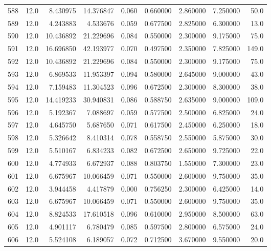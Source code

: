 \begin{tabular}{lrrrrrrrr}
588  &   12.0 &   8.430975 &  14.376847 &  0.060 &  0.660000 &  2.860000 &   7.250000 &   50.0 \\
589  &   12.0 &   4.243883 &   4.533676 &  0.059 &  0.677500 &  2.825000 &   6.300000 &   13.0 \\
590  &   12.0 &  10.436892 &  21.229696 &  0.084 &  0.550000 &  2.300000 &   9.175000 &   75.0 \\
591  &   12.0 &  16.696850 &  42.193977 &  0.070 &  0.497500 &  2.350000 &   7.825000 &  149.0 \\
592  &   12.0 &  10.436892 &  21.229696 &  0.084 &  0.550000 &  2.300000 &   9.175000 &   75.0 \\
593  &   12.0 &   6.869533 &  11.953397 &  0.094 &  0.580000 &  2.645000 &   9.000000 &   43.0 \\
594  &   12.0 &   7.159483 &  11.304523 &  0.096 &  0.672500 &  2.300000 &   8.300000 &   38.0 \\
595  &   12.0 &  14.419233 &  30.940831 &  0.086 &  0.588750 &  2.635000 &   9.000000 &  109.0 \\
596  &   12.0 &   5.192367 &   7.088697 &  0.059 &  0.577500 &  2.500000 &   6.825000 &   24.0 \\
597  &   12.0 &   4.645750 &   5.687650 &  0.071 &  0.617500 &  2.450000 &   6.250000 &   18.0 \\
598  &   12.0 &   5.326642 &   8.410314 &  0.078 &  0.558750 &  2.550000 &   5.875000 &   30.0 \\
599  &   12.0 &   5.510167 &   6.834233 &  0.082 &  0.672500 &  2.650000 &   9.725000 &   22.0 \\
600  &   12.0 &   4.774933 &   6.672937 &  0.088 &  0.803750 &  1.550000 &   7.300000 &   23.0 \\
601  &   12.0 &   6.675967 &  10.066459 &  0.071 &  0.550000 &  2.600000 &   9.750000 &   35.0 \\
602  &   12.0 &   3.944458 &   4.417879 &  0.000 &  0.756250 &  2.300000 &   6.425000 &   14.0 \\
603  &   12.0 &   6.675967 &  10.066459 &  0.071 &  0.550000 &  2.600000 &   9.750000 &   35.0 \\
604  &   12.0 &   8.824533 &  17.610518 &  0.096 &  0.610000 &  2.950000 &   8.500000 &   63.0 \\
605  &   12.0 &   4.901117 &   6.780479 &  0.085 &  0.597500 &  2.800000 &   6.575000 &   24.0 \\
606  &   12.0 &   5.524108 &   6.189057 &  0.072 &  0.712500 &  3.670000 &   9.550000 &   20.0 \\

\end{tabular}
